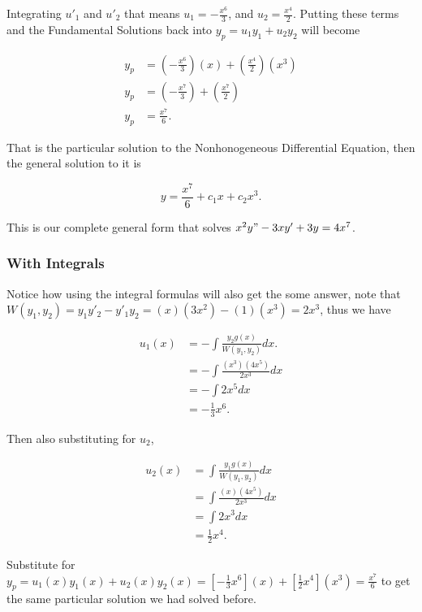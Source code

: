 \documentclass[12pt]{article}
\begin{document}
Integrating $u'_1$ and $u'_2$ that means $u_1=-\frac{x^6}{3}$, and $u_2=\frac{x^4}{2}$. Putting these terms and the Fundamental Solutions back into $y_p=u_1y_1+u_2y_2$ will become

\begin{align*}
    y_p &= \left(-\frac{x^6}{3}\right)(x)+\left(\frac{x^4}{2}\right)(x^3) \\
    y_p &= \left(-\frac{x^7}{3}\right)+\left(\frac{x^7}{2}\right) \\
    y_p &= \frac{x^7}{6}.
\end{align*}

That is the particular solution to the Nonhonogeneous Differential Equation, then the general solution to it is

\begin{equation*}
    y=\frac{x^7}{6}+c_1x+c_2x^3.
\end{equation*}

This is our complete general form that solves $x^2y"-3xy'+3y=4x^7$. \\

\subsubsection{With Integrals}

Notice how using the integral formulas will also get the some answer, note that $W(y_1,y_2)=y_1y'_2-y'_1y_2=(x)(3x^2)-(1)(x^3)=2x^3$, thus we have

\begin{align*}
    u_1(x) &= -\int \frac{y_2g(x)}{W(y_1,y_2)} dx. \\
           &= -\int \frac{(x^3)(4x^5)}{2x^3} dx \\
           &= -\int 2x^5 dx \\
           &= -\frac{1}{3}x^6. 
\end{align*}

Then also substituting for $u_2$,

\begin{align*}
    u_2(x) &= \int \frac{y_1g(x)}{W(y_1,y_2)} dx \\
           &= \int \frac{(x)(4x^5)}{2x^3} dx \\
           &= \int 2x^3 dx \\
           &= \frac{1}{2}x^4.
\end{align*}

Substitute for $y_p=u_1(x)y_1(x)+u_2(x)y_2(x)=[-\frac{1}{3}x^6](x)+[\frac{1}{2}x^4](x^3)=\frac{x^7}{6}$ to get the same particular solution we had solved before.
\end{document}
